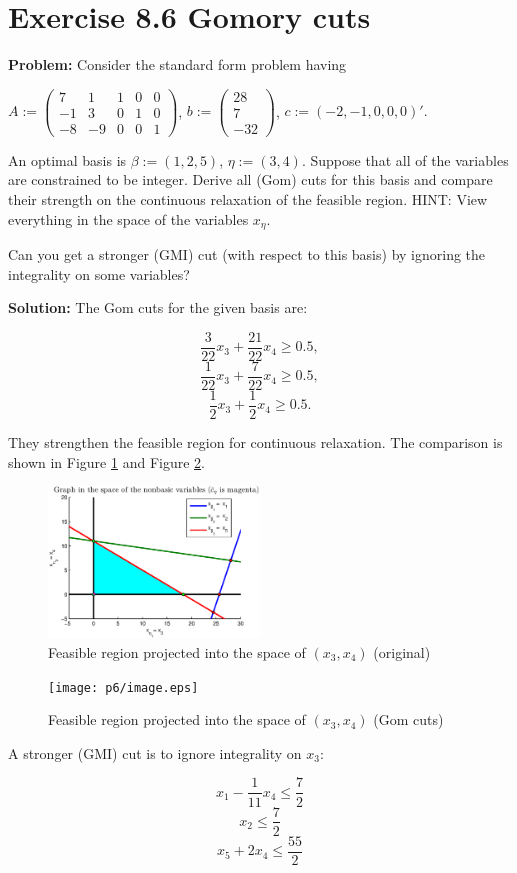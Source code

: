 \section{Exercise 8.6 Gomory cuts}
\textbf{Problem:} Consider the standard form problem having

$A:=\left( \begin{array}{ccccc} 7 & 1 & 1 & 0 & 0 \\ -1 & 3 & 0 & 1 & 0 \\ -8 & -9 & 0 & 0 & 1 \end{array}\right)$, $b:=\left( \begin{array}{c} 28 \\ 7 \\ -32 \end{array}\right)$, $c:=(-2, -1,0,0,0)'.$

An optimal basis is $\beta:=(1,2,5)$, $\eta:=(3,4)$. Suppose that all of the variables are constrained to be integer. Derive all (Gom) cuts for this basis and compare their strength on the continuous relaxation of the feasible region. HINT: View everything in the space of the variables $x_{\eta}$.

Can you get a stronger (GMI) cut (with respect to this basis) by ignoring the integrality on some variables?

\textbf{Solution:} The Gom cuts for the given basis are:

$$ \frac{3}{22}x_3 + \frac{21}{22}x_4 \geq 0.5, $$
$$ \frac{1}{22}x_3 + \frac{7}{22}x_4 \geq 0.5, $$
$$ \frac{1}{2}x_3 + \frac{1}{2}x_4 \geq 0.5. $$

They strengthen the feasible region for continuous relaxation. The comparison is shown in Figure \ref{fig:p1} and Figure \ref{fig:p2}.

\begin{figure}[h!!]
\includegraphics[width=0.5\textwidth]{p6/original.eps}
\caption{Feasible region projected into the space of $(x_3,x_4)$ (original)}\label{fig:p1}
\end{figure}

\begin{figure}[h!!]
\texttt{[image: p6/image.eps]}
\caption{Feasible region projected into the space of $(x_3,x_4)$ (Gom cuts)}\label{fig:p2}
\end{figure}

A stronger (GMI) cut is to ignore integrality on $x_3$:

$$x_1-\frac{1}{11}x_4 \leq \frac{7}{2}$$
$$x_2 \leq \frac{7}{2}$$
$$x_5+2x_4 \leq \frac{55}{2}$$
